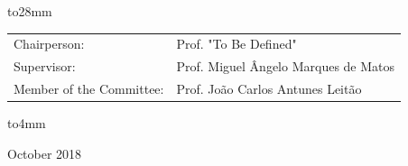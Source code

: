 \begin{singlespace}
{\vbox to28mm{
\vfil
{\large
\begin{center}
\begin{tabular}{p{}l}
Chairperson: &  Prof. "To Be Defined" \\
Supervisor: & Prof. Miguel Ângelo Marques de Matos\\
Member of the Committee: & Prof. João Carlos Antunes Leitão \\
\end{tabular}
\end{center}
}
\vfil
}%
\vskip28mm%
\vbox to4mm{\Large\bf
\vfil
\begin{center}
October 2018
\end{center}
\vfil
}%
}%
\end{singlespace}
\null\newpage